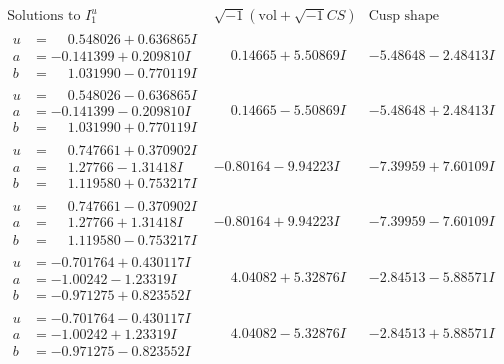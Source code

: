 \documentclass[1p]{elsarticle_modified}
\theoremstyle{definition}
\newcommand{\I}{\sqrt{-1}}
\begin{document}
$$\begin{array}{c|c|c}  
\text{Solutions to }I^u_{1}& \I (\text{vol} + \sqrt{-1}CS) & \text{Cusp shape}\\
 \hline 
\begin{aligned}
u &= \phantom{-}0.548026 + 0.636865 I \\
a &= -0.141399 + 0.209810 I \\
b &= \phantom{-}1.031990 - 0.770119 I\end{aligned}
 & \phantom{-}0.14665 + 5.50869 I & -5.48648 - 2.48413 I \\ \hline\begin{aligned}
u &= \phantom{-}0.548026 - 0.636865 I \\
a &= -0.141399 - 0.209810 I \\
b &= \phantom{-}1.031990 + 0.770119 I\end{aligned}
 & \phantom{-}0.14665 - 5.50869 I & -5.48648 + 2.48413 I \\ \hline\begin{aligned}
u &= \phantom{-}0.747661 + 0.370902 I \\
a &= \phantom{-}1.27766 - 1.31418 I \\
b &= \phantom{-}1.119580 + 0.753217 I\end{aligned}
 & -0.80164 - 9.94223 I & -7.39959 + 7.60109 I \\ \hline\begin{aligned}
u &= \phantom{-}0.747661 - 0.370902 I \\
a &= \phantom{-}1.27766 + 1.31418 I \\
b &= \phantom{-}1.119580 - 0.753217 I\end{aligned}
 & -0.80164 + 9.94223 I & -7.39959 - 7.60109 I \\ \hline\begin{aligned}
u &= -0.701764 + 0.430117 I \\
a &= -1.00242 - 1.23319 I \\
b &= -0.971275 + 0.823552 I\end{aligned}
 & \phantom{-}4.04082 + 5.32876 I & -2.84513 - 5.88571 I \\ \hline\begin{aligned}
u &= -0.701764 - 0.430117 I \\
a &= -1.00242 + 1.23319 I \\
b &= -0.971275 - 0.823552 I\end{aligned}
 & \phantom{-}4.04082 - 5.32876 I & -2.84513 + 5.88571 I \\ \hline\begin{aligned}

\end{aligned}
\end{array}$$
\end{document}
